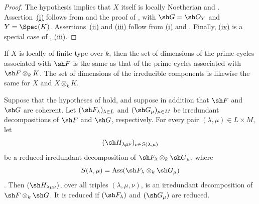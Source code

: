 \begin{proof}
The hypothesis implies that $X$ itself is locally Noetherian
 and .
Assertion~{\hyperref[IV.4.2.7.i]{(i)}} follows from
 and the proof of , with
$\sh G=\sh O_Y$ and $Y=\Spec(K)$.
Assertions~{\hyperref[IV.4.2.7.ii]{(ii)}} and
{\hyperref[IV.4.2.7.iii]{(iii)}} follow from
{\hyperref[IV.4.2.7.i]{(i)}} and .
Finally, {\hyperref[IV.4.2.7.iv]{(iv)}} is a special case of
{\hyperref[IV.4.2.4.iii]{, (iii)}}.
\end{proof}

\begin{corollary}[4.2.8]
\label{IV.4.2.8}
If $X$ is locally of finite type over $k$, then the set of dimensions
of the prime cycles associated with $\sh F$ is the same as that of the
prime cycles associated with $\sh F\otimes_k K$.
The set of dimensions of the irreducible components is likewise the
same for $X$ and $X\otimes_k K$.
\end{corollary}

\begin{proposition}[4.2.9]
\label{IV.4.2.9}
Suppose that the hypotheses of  hold, and suppose in
addition that $\sh F$ and $\sh G$ are coherent.
Let $(\sh F_\lambda)_{\lambda\in L}$ and
$(\sh G_\mu)_{\mu\in M}$ be irredundant decompositions of $\sh F$ and
$\sh G$, respectively.
For every pair $(\lambda,\mu)\in L\times M$, let
\[
(\sh H_{\lambda\mu\nu})_{\nu\in S(\lambda,\mu)}
\]
be a reduced irredundant decomposition of
$\sh F_\lambda\otimes_k\sh G_\mu$, where
\[
S(\lambda,\mu)
=\operatorname{Ass}(\sh F_\lambda\otimes_k\sh G_\mu)
\]
.
Then $(\sh H_{\lambda\mu\nu})$, over all triples
$(\lambda,\mu,\nu)$, is an irredundant decomposition of
$\sh F\otimes_k\sh G$.
It is reduced if $(\sh F_\lambda)$ and $(\sh G_\mu)$ are reduced.
\end{proposition}

